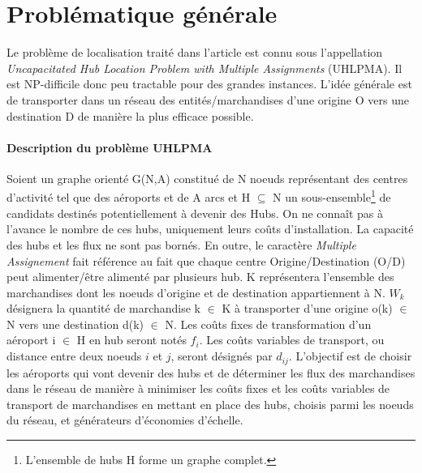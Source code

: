 \section{Problématique générale}

Le problème de localisation traité dans l'article est connu sous l'appellation \textit{Uncapacitated Hub Location Problem with Multiple Assignments} (UHLPMA). Il est NP-difficile donc peu tractable pour des grandes instances. L'idée générale est de transporter dans un réseau des entités/marchandises d'une origine O vers une destination D de manière la plus efficace possible. 


\paragraph{Description du problème UHLPMA}
Soient un graphe orienté G(N,A) constitué de N noeuds représentant des centres d'activité tel que des aéroports et de A arcs et H $\subseteq $ N un sous-ensemble\footnote{L'ensemble de hubs H forme un graphe complet.} de candidats destinés potentiellement à devenir des Hubs. On ne connaît pas à l'avance le nombre de ces hubs, uniquement leurs coûts d'installation. La capacité des hubs et les flux ne sont pas bornés. En outre, le caractère \textit{Multiple Assignement} fait référence au fait que chaque centre Origine/Destination (O/D) peut alimenter/être alimenté par plusieurs hub.
K représentera l'ensemble des marchandises dont les noeuds d'origine et de destination
appartiennent à N. $ W_k $ désignera la quantité de marchandise k $\in$ K  à transporter d'une origine o(k) $\in$ N vers une destination d(k) $\in$ N. Les coûts fixes de transformation d'un aéroport i $\in$ H en hub seront notés $ f_i$. Les coûts variables de transport, ou distance entre deux noeuds $i$ et $j$, seront désignés par $d_{ij}$.
L'objectif est de choisir les aéroports qui vont devenir des hubs et de déterminer les flux des marchandises dans le réseau de manière à minimiser les coûts fixes et les coûts variables de transport de marchandises en mettant en place des hubs, choisis parmi les noeuds du réseau, et générateurs d'économies d'échelle. 



  





















 